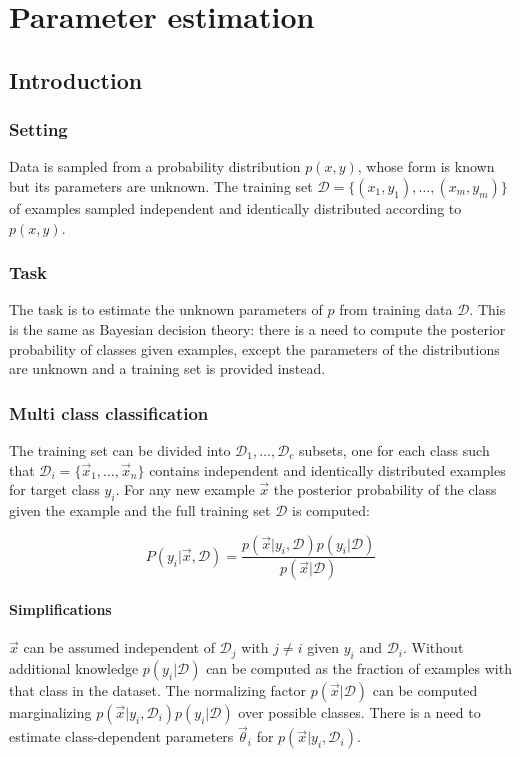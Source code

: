 \chapter{Parameter estimation}

\section{Introduction}

	\subsection{Setting}
	Data is sampled from a probability distribution $p(x, y)$, whose form is known but its parameters are unknown.
	The training set $\mathcal{D} = \{(x_1, y_1), \dots, (x_m, y_m)\}$ of examples sampled independent and identically distributed according to $p(x,y)$.

	\subsection{Task}
	The task is to estimate the unknown parameters of $p$ from training data $\mathcal{D}$.
	This is the same as Bayesian decision theory: there is a need to compute the posterior probability of classes given examples, except the parameters of the distributions are unknown and a training set is provided instead.

	\subsection{Multi class classification}
	The training set can be divided into $\mathcal{D}_1, \dots, \mathcal{D}_c$ subsets, one for each class such that $\mathcal{D}_i = \{\vec{x}_1, \dots, \vec{x}_n\}$ contains independent and identically distributed examples for target class $y_i$.
	For any new example $\vec{x}$ the posterior probability of the class given the example and the full training set $\mathcal{D}$ is computed:

	$$P(y_i|\vec{x}, \mathcal{D}) = \frac{p(\vec{x}|y_i, \mathcal{D})p(y_i|\mathcal{D})}{p(\vec{x}|\mathcal{D})}$$

		\subsubsection{Simplifications}
		$\vec{x}$ can be assumed independent of $\mathcal{D}_j$ with $j\neq i$ given $y_i$ and $\mathcal{D}_i$.
		Without additional knowledge $p(y_i|\mathcal{D})$ can be computed as the fraction of examples with that class in the dataset.
		The normalizing factor $p(\vec{x}|\mathcal{D})$ can be computed marginalizing $p(\vec{x}|y_i, \mathcal{D}_i)p(y_i|\mathcal{D})$ over possible classes.
		There is a need to estimate class-dependent parameters $\vec{\theta}_i$ for $p(\vec{x}|y_i, \mathcal{D}_i)$.

